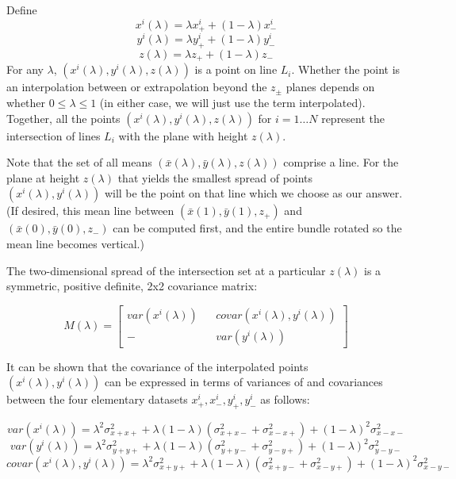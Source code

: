 \documentclass[10pt]{amsart}
\begin{document}
Define
$$x^i(\lambda) = \lambda x^i_+ + (1-\lambda) x^i_-$$
$$y^i(\lambda) = \lambda y^i_+ + (1-\lambda) y^i_-$$
$$z(\lambda) = \lambda z_+ + (1-\lambda) z_-$$ For any $\lambda$,
$(x^i(\lambda), y^i(\lambda), z(\lambda))$ is a point on line $L_i$. Whether the
point is an interpolation between or extrapolation beyond the $z_\pm$ planes
depends on whether $0\le\lambda\le 1$ (in either case, we will just use the term
interpolated). Together, all the points $(x^i(\lambda), y^i(\lambda),
z(\lambda))$ for $i=1\ldots N$ represent the intersection of lines $L_i$ with
the plane with height $z(\lambda)$.

Note that the set of all means $(\bar{x}(\lambda),\bar{y}(\lambda),z(\lambda))$
comprise a line. For the plane at height $z(\lambda)$ that yields the smallest
spread of points $(x^i(\lambda),y^i(\lambda))$ will be the point on that line
which we choose as our answer. (If desired, this mean line between $(\bar{x}(1),
\bar{y}(1),z_+)$ and $(\bar{x}(0),\bar{y}(0),z_-)$ can be computed first, and
the entire bundle rotated so the mean line becomes vertical.)

The two-dimensional spread of the intersection set at a particular $z(\lambda)$
is a symmetric, positive definite, 2x2 covariance matrix:

\[M(\lambda) =
\begin{bmatrix}
 var(x^i(\lambda)) && covar(x^i(\lambda),y^i(\lambda)) \\
  -                && var(y^i(\lambda))
\end{bmatrix}
\]

It can be shown that the covariance of the interpolated points
$(x^i(\lambda), y^i(\lambda))$ can be expressed in terms of variances of and
covariances between the four elementary datasets $x^i_+, x^i_-, y^i_+, y^i_-$ as
follows:

\begin{equation}\label{varx}
var(x^i(\lambda)) = \lambda^2\sigma^2_{x+x+} + \lambda(1-\lambda)(\sigma^2_{x+x-} + \sigma^2_{x-x+}) 
                + (1-\lambda)^2\sigma^2_{x-x-}
\end{equation}
\begin{equation}\label{vary}
var(y^i(\lambda)) = \lambda^2\sigma^2_{y+y+} + \lambda(1-\lambda)(\sigma^2_{y+y-} + \sigma^2_{y-y+}) 
                + (1-\lambda)^2\sigma^2_{y-y-}\end{equation}
\begin{equation}\label{covarxy}
covar(x^i(\lambda),y^i(\lambda)) = \lambda^2\sigma^2_{x+y+}  
                        + \lambda(1-\lambda)(\sigma^2_{x+y-} + \sigma^2_{x-y+}) 
                              + (1-\lambda)^2\sigma^2_{x-y-}
\end{equation}
\end{document}
